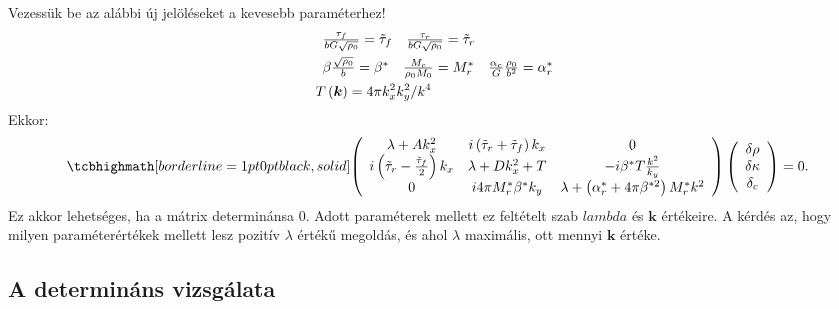 \documentclass[10pt,a4paper]{scrartcl}
\let\mathbf\bm
\begin{document}
Vezessük be az alábbi új jelöléseket a kevesebb paraméterhez!
\[\begin{gathered}
  \begin{array}{*{20}{c}}
  {\frac{{{\tau _f}}}{{bG\sqrt {{\rho _0}} }} = {{\tilde \tau }_f}}&{\frac{{{\tau _r}}}{{bG\sqrt {{\rho _0}} }} = {{\tilde \tau }_r}} 
\end{array} \hfill \\
  \begin{array}{*{20}{c}}
  {\beta \frac{{\sqrt {{\rho _0}} }}{b} = {\beta ^*}}&{\frac{{{M_c}}}{{{\rho _0}{M_0}}} = M_r^*}&{\frac{{{\alpha _c}}}{G}\frac{{{\rho _0}}}{{{b^2}}} = \alpha _r^*}
\end{array} \hfill \\
  T\left( {\mathbf{k}} \right) = 4\pi k_x^2k_y^2/{k^4} \hfill \\ 
\end{gathered} \]
Ekkor:
\begin{equation} \label{eq:matrix_det_to0}
\tcbhighmath[borderline={1pt}{0pt}{black,solid}]{
\left( {\begin{array}{*{20}{c}}
  {\lambda  + Ak_x^2}&{i\left( {{{\tilde \tau }_r} + {{\tilde \tau }_f}} \right){k_x}}&0 \\ 
  {i\left( {{{\tilde \tau }_r} - \frac{{{{\tilde \tau }_f}}}{2}} \right){k_x}}&{\lambda  + Dk_x^2 + T}&{ - i{\beta ^*}T\frac{{{k^2}}}{{{k_y}}}} \\ 
  0&{i4\pi M_r^*{\beta ^*}{k_y}}&{\lambda + \left( {\alpha _r^* + 4\pi {\beta ^{ * 2}}} \right)M_r^*{k^2}} 
\end{array}} \right)\left( {\begin{array}{*{20}{c}}
  {\delta \rho } \\ 
  {\delta \kappa } \\ 
  {{\delta _c}} 
\end{array}} \right) = 0.}
\end{equation}
Ez akkor lehetséges, ha a mátrix determinánsa $0$. Adott paraméterek mellett ez feltételt szab $lambda$ és $\mathbf{k}$ értékeire. A kérdés az, hogy milyen paraméterértékek mellett lesz pozitív $\lambda$  értékű megoldás, és ahol $\lambda$ maximális, ott mennyi $\mathbf{k}$ értéke.

\subsection{A determináns vizsgálata}
\end{document}
